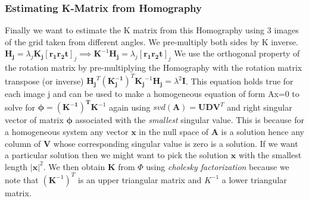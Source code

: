 \documentclass[titlepage]{article}
\begin{document}
\subsubsection{Estimating K-Matrix from Homography}
\label{estK}
Finally we want to estimate the K matrix from this Homography using 3 images of the grid taken from different angles. We pre-multiply both sides by K inverse. $\mathbf{H_j} = \lambda_j \mathbf{K_j} [\mathbf{r_1} \mathbf{r_2} \mathbf{t}]_j \implies \mathbf{K}^{-1} \mathbf{H_j} = \lambda_j [\mathbf{r_1} \mathbf{r_2} \mathbf{t}]_j$
We use the orthogonal property of the rotation matrix by pre-multiplying the Homography with the rotation matrix transpose (or inverse) $\mathbf{H_j}^T (\mathbf{K_j^{-1}})^{T} \mathbf{K_j}^{-1} \mathbf{H_j} = \lambda^2 \mathbf{I}$. 
This equation holds true for each image j and can be used to make a homogeneous equation of form Ax=0 to solve for $\mathbf{\phi} = \mathbf{({K}^{-1})^T} \mathbf{K}^{-1}$ again using $svd(\mathbf{A}) = \mathbf{U} \mathbf{D} \mathbf{V}^T$ and right singular vector of matrix $\mathbf{\phi}$ associated with the \textit{smallest} singular value. This is because for a homogeneous system any vector $\mathbf{x}$ in the null space of \textbf{A} is a solution hence any column of $\mathbf{V}$ whose corresponding singular value is zero is a solution. If we want a particular solution then we might want to pick the solution $\mathbf{x}$ with the smallest length $|\mathbf{x}|^2$. We then obtain \textbf{K} from $\Phi$ using \textit{cholesky factorization} because we note that $(\mathbf{K}^{-1})^T$ is an upper triangular matrix and $K^{-1}$ a lower triangular matrix.
\end{document}
